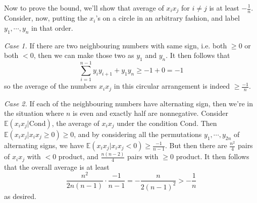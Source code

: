 \documentclass[11pt,a4paper]{article}
\begin{document}
\begin{enumerate}
	Now to prove the bound, we'll show that average of $x_ix_j$ for $i\neq j$ 
	is at least $-\frac{1}{n}$. 
	Consider, now, putting the $x_i$'s on a circle in an arbitrary fashion, 
	and label $y_1, \cdots, y_n$ in that order. 
	
	\emph{Case 1.} 
	If there are two neighbouring numbers with same sign, 
	i.e. both $\ge 0$ or both $<0$, 
	then we can make those two as $y_1$ and $y_n$. 
	It then follows that 
	\[
	\sum_{i=1}^{n-1}y_iy_{i+1}+y_1y_n\ge -1+0=-1
	\]
	so the average of the numbers $x_ix_j$ in this circular arrangement is indeed $\ge \frac{-1}{n}$. 
	
	\emph{Case 2.} 
	If each of the neighbouring numbers have alternating sign, 
	then we're in the situation where $n$ is even and exactly half are nonnegative. 
	Consider $\mathbb{E}(x_ix_j|\text{Cond})$, 
	the average of $x_ix_j$ under the condition $\text{Cond}$. 
	Then $\mathbb{E}(x_ix_j|x_ix_j\ge 0)\ge 0$, 
	and by considering all the permutations $y_1, \cdots, y_{2n}$ of alternating signs, 
	we have $\mathbb{E}(x_ix_j|x_ix_j< 0)\ge \frac{-1}{n-1}$. 
	But then there are $\frac{n^2}{4}$ pairs of $x_ix_j$ with $<0$ product, 
	and $\frac{n(n-2)}{4}$ pairs with $\ge 0$ product. 
	It then follows that the overall average is at least 
	\[
	\frac{n^2}{2n(n-1)}\cdot \frac{-1}{n-1}=-\frac{n}{2(n-1)^2} > -\frac{1}{n}
	\]
	as desired. 
\end{enumerate}
\end{document}
